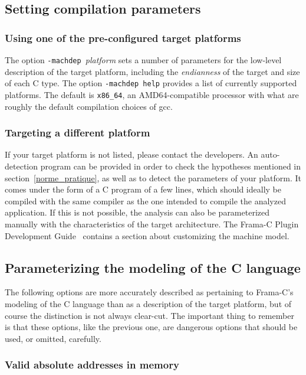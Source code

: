 \documentclass[web]{frama-c-book}
\begin{document}
\subsection{Setting compilation parameters} \label{compilation}

\subsubsection{Using one of the pre-configured target platforms}

The option \lstinline|-machdep |{\it platform} 
sets a number of parameters for the low-level description of the
target platform, including the 
\emph{endianness} of the target and size of each C type.
The option \lstinline|-machdep help| provides a list of currently supported
platforms. The default is \lstinline|x86_64|, an AMD64-compatible processor with
what are roughly the default compilation choices of gcc.

\subsubsection{Targeting a different platform}

If your target platform  is not listed,
please contact the developers. 
An auto-detection program can be provided in order to check the hypotheses
mentioned in section~\ref{norme_pratique}, as well as to detect the
parameters of your platform.
It comes under the form of a C program of a few lines, which should ideally be
compiled with the same compiler as the one intended to compile the
analyzed application. If this is not possible, the analysis can also be
parameterized manually with the characteristics of the target
architecture. 
The Frama-C Plugin Development Guide~\cite{plugin-dev-guide} contains a
section about customizing the machine model.

\subsection{Parameterizing the modeling of the C language}

The following options are more accurately described as 
pertaining to Frama-C's modeling of the C language 
than as a description of the target platform, but of course
the distinction is not always clear-cut. The important thing to remember
is that these options, like the previous one, are dangerous options
that should be used, or omitted, carefully.

\subsubsection{Valid absolute addresses in memory}
\end{document}
